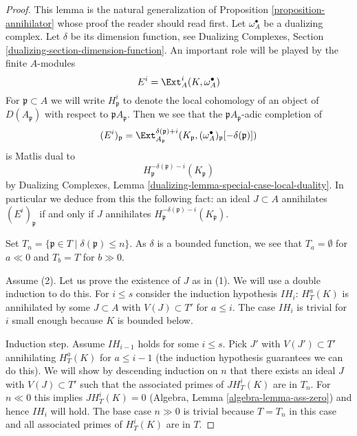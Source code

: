 \begin{proof}
This lemma is the natural generalization of
Proposition \ref{proposition-annihilator}
whose proof the reader should read first.
Let $\omega_A^\bullet$ be a dualizing complex. Let $\delta$ be its
dimension function, see Dualizing Complexes, Section
\ref{dualizing-section-dimension-function}.
An important role will be played by the finite $A$-modules
$$
E^i = \Ext_A^i(K, \omega_A^\bullet)
$$
For $\mathfrak p \subset A$ we will write $H^i_\mathfrak p$ to denote the
local cohomology of an object of $D(A_\mathfrak p)$ with respect to
$\mathfrak pA_\mathfrak p$. Then we see that
the $\mathfrak pA_\mathfrak p$-adic completion of
$$
(E^i)_\mathfrak p =
\Ext^{\delta(\mathfrak p) + i}_{A_\mathfrak p}(K_\mathfrak p,
(\omega_A^\bullet)_\mathfrak p[-\delta(\mathfrak p)])
$$
is Matlis dual to
$$
H^{-\delta(\mathfrak p) - i}_{\mathfrak p}(K_\mathfrak p)
$$
by
Dualizing Complexes, Lemma \ref{dualizing-lemma-special-case-local-duality}.
In particular we deduce from this the
following fact: an ideal $J \subset A$ annihilates
$(E^i)_\mathfrak p$ if and only if $J$ annihilates
$H^{-\delta(\mathfrak p) - i}_{\mathfrak p}(K_\mathfrak p)$.

\medskip\noindent
Set $T_n = \{\mathfrak p \in T \mid \delta(\mathfrak p) \leq n\}$.
As $\delta$ is a bounded function, we see that
$T_a = \emptyset$ for $a \ll 0$ and $T_b = T$ for $b \gg 0$.

\medskip\noindent
Assume (2). Let us prove the existence of $J$ as in (1).
We will use a double induction to do this. For $i \leq s$
consider the induction hypothesis $IH_i$:
$H^a_T(K)$ is annihilated by some $J \subset A$ with $V(J) \subset T'$
for $a \leq i$. The case $IH_i$ is trivial for $i$ small
enough because $K$ is bounded below.

\medskip\noindent
Induction step. Assume $IH_{i - 1}$ holds for some $i \leq s$.
Pick $J'$ with $V(J') \subset T'$ annihilating $H^a_T(K)$ for
$a \leq i - 1$ (the induction hypothesis guarantees we can
do this). We will show by descending induction on $n$
that there exists an ideal $J$ with $V(J) \subset T'$ such that the
associated primes of $J H^i_T(K)$ are in $T_n$.
For $n \ll 0$ this implies $JH^i_T(K) = 0$ 
(Algebra, Lemma \ref{algebra-lemma-ass-zero})
and hence $IH_i$ will hold.
The base case $n \gg 0$ is trivial because $T = T_n$ in this case
and all associated primes of $H^i_T(K)$ are in $T$.


\end{proof}
